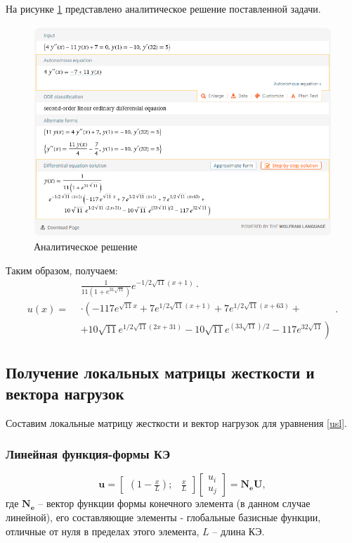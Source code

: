 На рисунке \ref{analit} представлено аналитическое решение поставленной задачи.
\begin{figure}[!h]
\begin{center}
\includegraphics[scale = 0.5]{labs/img/img1}
\end{center}
\caption{Аналитическое решение}
\label{analit}
\end{figure}

Таким образом, получаем:
$$
u(x)=\begin{align} & \frac{1}{11\left(1+e^{31 \sqrt{11}}\right)} e^{-1 / 2 \sqrt{11}(x+1)} \cdot \\ & \cdot \left(-117 e^{\sqrt{11} x}+7 e^{1 / 2 \sqrt{11}(x+1)}+7 e^{1 / 2 \sqrt{11}(x+63)}+\right. \\ & \left. + 10 \sqrt{11} e^{1 / 2 \sqrt{11}(2 x+31)}-10 \sqrt{11} e^{(33 \sqrt{11}) / 2}-117 e^{32 \sqrt{11}}\right) \end{align}.
$$


\subsection{Получение локальных матрицы жесткости и вектора нагрузок}

Составим локальные матрицу жесткости и вектор нагрузок для уравнения \ref{usl}.

\subsubsection{Линейная функция-формы КЭ}

$$
\mathbf{u}=\begin{bmatrix}
(1-\frac{x}{L}) ; & \frac{x}{L}
\end{bmatrix}
\begin{bmatrix}
u_i \\
u_j
\end{bmatrix}
=\mathbf{N_eU},
$$
где $\mathbf{N_e}$ -- вектор функции формы конечного элемента (в данном случае линейной), его составляющие элементы - глобальные базисные функции, отличные от нуля в пределах этого элемента, $L$ -- длина КЭ.

